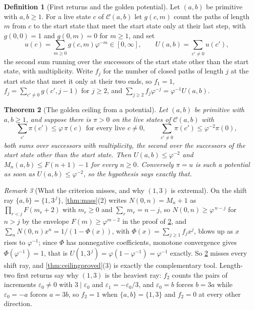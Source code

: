 \documentclass[11pt]{amsart}
\newtheorem{theorem}{Theorem}[section]
\theoremstyle{definition}
\newtheorem{definition}[theorem]{Definition}
\theoremstyle{remark}
\newtheorem{remark}[theorem]{Remark}
\begin{document}
\begin{definition}[First returns and the golden potential]
\label{def:golden}
Let $(a,b)$ be primitive with $a,b\ge 1$. For a live state $c$ of $\mathcal{C}(a,b)$ let $g(c,m)$ count the paths of length $m$ from $c$ to the start state that meet the start state only at their last step, with $g(0,0)=1$ and $g(0,m)=0$ for $m\ge 1$, and set
\[
u(c)=\sum_{m\ge 0}g(c,m)\varphi^{-m}\in[0,\infty],
\qquad
U(a,b)=\sum_{c'\neq 0}u(c') ,
\]
the second sum running over the successors of the start state other than the start state, with multiplicity. Write $f_j$ for the number of closed paths of length $j$ at the start state that meet it only at their two ends, so $f_1=1$, $f_j=\sum_{c'\neq 0}g(c',j-1)$ for $j\ge 2$, and $\sum_{j\ge 2}f_j\varphi^{-j}=\varphi^{-1}U(a,b)$.
\end{definition}

\begin{theorem}[The golden ceiling from a potential]
\label{thm:potential}
Let $(a,b)$ be primitive with $a,b\ge 1$, and suppose there is $\pi>0$ on the live states of $\mathcal{C}(a,b)$ with
\[
\sum_{c'}\pi(c')\le\varphi\,\pi(c)\ \ \text{for every live }c\neq 0,
\qquad
\sum_{c'\neq 0}\pi(c')\le\varphi^{-2}\pi(0),
\]
both sums over successors with multiplicity, the second over the successors of the start state other than the start state. Then $U(a,b)\le\varphi^{-2}$ and $M_n(a,b)\le F(n+1)-1$ for every $n\ge 0$. Conversely $\pi=u$ is such a potential as soon as $U(a,b)\le\varphi^{-2}$, so the hypothesis says exactly that.
\end{theorem}

\begin{remark}[What the criterion misses, and why $(1,3)$ is extremal]
\label{rem:golden}
On the shift ray $\{a,b\}=\{1,3^{\,j}\}$, \cref{thm:mass}(2) writes $N(0,n)=M_n+1$ as $\prod_{r<j}F(m_r+2)$ with $m_r\ge 0$ and $\sum_rm_r=n-j$, so $N(0,n)\ge\varphi^{\,n-j}$ for $n>j$ by the envelope $F(m)\ge\varphi^{m-2}$ in the proof of \cref{thm:potential}, and $\sum_nN(0,n)x^n=1/(1-\Phi(x))$, with $\Phi(x)=\sum_{j\ge1}f_jx^j$, blows up as $x$ rises to $\varphi^{-1}$; since $\Phi$ has nonnegative coefficients, monotone convergence gives $\Phi(\varphi^{-1})=1$, that is $U(1,3^{\,j})=\varphi(1-\varphi^{-1})=\varphi^{-1}$ exactly. So \cref{thm:potential} misses every shift ray, and \cref{thm:ceilingproved}(3) is exactly the complementary tool. Length-two first returns say why $(1,3)$ is the heaviest ray: $f_2$ counts the pairs of increments $\varepsilon_0\neq 0$ with $3\mid\varepsilon_0$ and $\varepsilon_1=-\varepsilon_0/3$, and $\varepsilon_0=b$ forces $b=3a$ while $\varepsilon_0=-a$ forces $a=3b$, so $f_2=1$ when $\{a,b\}=\{1,3\}$ and $f_2=0$ at every other direction.
\end{remark}
\end{document}

